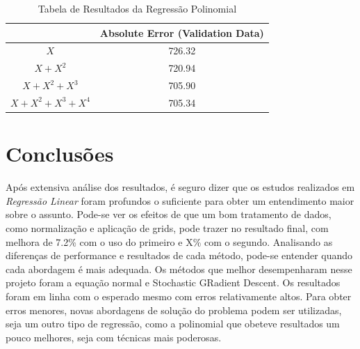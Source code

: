 \documentclass[conference]{IEEEtran}
\begin{document}
\begin{table}[H]
\centering
\begin{tabular}{|c|c|}
\hline
               								& Absolute Error (Validation Data) \\ \hline
$X$     											& 726.32                        \\ \hline
$X + X^{2}$ 									& 720.94                        \\ \hline
$X + X^{2} + X^{3}$   				& 705.90                        \\ \hline
$X + X^{2} + X^{3} + X^{4}$   & 705.34                        \\ \hline
\end{tabular}
\caption{Tabela de Resultados da Regressão Polinomial}
\label{table:results_poli}
\end{table}

\section{Conclusões}


Após extensiva análise dos resultados, é seguro dizer que os estudos realizados em \textit{Regressão Linear} foram profundos o suficiente para obter um entendimento maior sobre o assunto.
Pode-se ver os efeitos de que um bom tratamento de dados, como normalização e aplicação de grids, pode trazer no resultado final, com melhora de 7.2\% com o uso do primeiro e X\% com o segundo.
Analisando as diferenças de performance e resultados de cada método, pode-se entender quando cada abordagem é mais adequada. Os métodos que melhor desempenharam nesse projeto foram a equação normal e Stochastic GRadient Descent.
Os resultados foram em linha com o esperado mesmo com erros relativamente altos. Para obter erros menores, novas abordagens de solução do problema podem ser utilizadas, seja um outro tipo de regressão, como a polinomial que obeteve resultados um pouco melhores, seja com técnicas mais poderosas.




\end{document}
